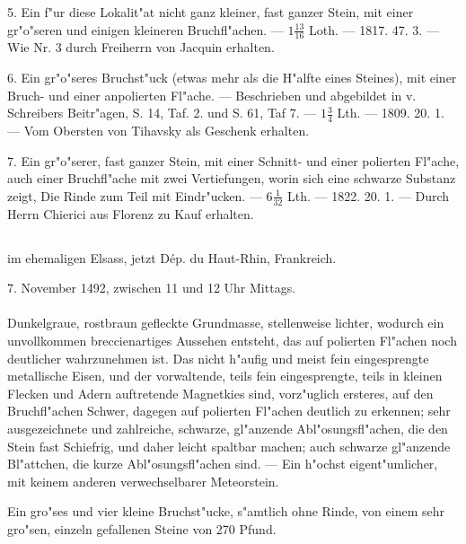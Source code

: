\documentclass[a4paper, 11pt, oneside, polutonikogreek, german]{article}
\begin{document}
5. Ein f"ur diese Lokalit"at nicht ganz kleiner, fast ganzer Stein, mit einer gr"o"seren und einigen kleineren Bruchfl"achen. --- $\mathfrak{1\frac{13}{16}}$ Loth. --- 1817. 47. 3. --- Wie Nr. 3 durch Freiherrn von Jacquin erhalten.

6. Ein gr"o"seres Bruchst"uck (etwas mehr als die H"alfte eines Steines), mit einer Bruch- und einer anpolierten Fl"ache. --- Beschrieben und abgebildet in v. Schreibers Beitr"agen, S. 14, Taf. 2. und S. 61, Taf 7. --- $\mathfrak{1\frac{3}{4}}$ Lth. --- 1809. 20. 1. --- Vom Obersten von Tihavsky als Geschenk erhalten.

7. Ein gr"o"serer, fast ganzer Stein, mit einer Schnitt- und einer polierten Fl"ache, auch einer Bruchfl"ache mit zwei Vertiefungen, worin sich eine schwarze Substanz zeigt, Die Rinde zum Teil mit Eindr"ucken. --- $\mathfrak{6\frac{1}{32}}$ Lth. --- 1822. 20. 1. --- Durch Herrn Chierici aus Florenz zu Kauf erhalten.
\subsection[\swabfamily {Ensisheim.}]{}
\begin{center}

im ehemaligen Elsass, jetzt Dép. du Haut-Rhin, Frankreich.

7. November 1492, zwischen 11 und 12 Uhr Mittags.
\end{center}
\paragraph{}
Dunkelgraue, rostbraun gefleckte Grundmasse, stellenweise lichter, wodurch ein unvollkommen breccienartiges Aussehen entsteht, das auf polierten Fl"achen noch deutlicher wahrzunehmen ist. Das nicht h"aufig und meist fein eingesprengte metallische Eisen, und der vorwaltende, teils fein eingesprengte, teils in kleinen Flecken und Adern auftretende Magnetkies sind, vorz"uglich ersteres, auf den Bruchfl"achen Schwer, dagegen auf polierten Fl"achen deutlich zu erkennen; sehr ausgezeichnete und zahlreiche, schwarze, gl"anzende Abl"osungsfl"achen, die den Stein fast Schiefrig, und daher leicht spaltbar machen; auch schwarze gl"anzende Bl"attchen‚ die kurze Abl"osungsfl"achen sind. --- Ein h"ochst eigent"umlicher, mit keinem anderen verwechselbarer Meteorstein.

Ein gro"ses und vier kleine Bruchst"ucke, s"amtlich ohne Rinde, von einem sehr gro"sen, einzeln gefallenen Steine von 270 Pfund.
\end{document}
